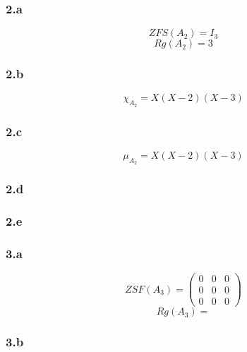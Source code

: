 \documentclass[10pt,a4paper]{article}
\begin{document}
\subsubsection*{2.a}

\begin{equation}
ZFS(A_{2}) = I_{3}
\end{equation}
\begin{equation}
Rg(A_{2}) = 3
\end{equation}

\subsubsection*{2.b}

\begin{equation}
\chi_{A_{2}} = X(X-2)(X-3)
\end{equation}

\subsubsection*{2.c}

\begin{equation}
\mu_{A_{2}} = X(X-2)(X-3)
\end{equation}

\subsubsection*{2.d}

\subsubsection*{2.e}

\subsubsection*{3.a}

\begin{equation}
ZSF(A_{3}) = 
\begin{pmatrix}
0 & 0 & 0\\
0 & 0 & 0\\
0 & 0 & 0
\end{pmatrix}
\end{equation}
\begin{equation}
Rg(A_{3}) = 
\end{equation}

\subsubsection*{3.b}
\end{document}
